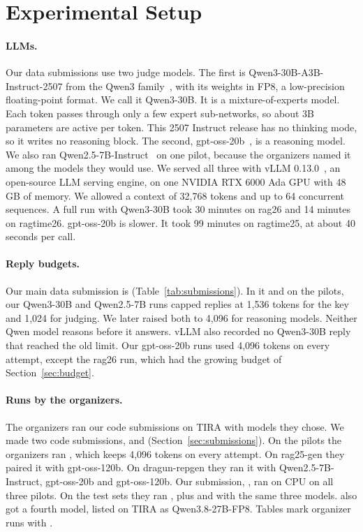 \section{Experimental Setup}
\label{sec:setup}

\paragraph{LLMs.} Our data submissions use two judge models. The first is
Qwen3-30B-A3B-Instruct-2507 from the Qwen3 family~\cite{yang2025qwen3}, with its
weights in FP8, a low-precision floating-point format. We call it Qwen3-30B. It is a mixture-of-experts
model. Each token passes through only a few expert sub-networks, so about 3B
parameters are active per token. This 2507 Instruct release has no thinking mode,
so it writes no reasoning block. The second, gpt-oss-20b~\cite{openai2025gptoss},
is a reasoning model. We also ran Qwen2.5-7B-Instruct~\cite{qwen2025qwen25} on one
pilot, because the organizers named it among the models they would use. We served
all three with vLLM 0.13.0~\cite{kwon2023vllm}, an open-source LLM serving engine,
on one NVIDIA RTX 6000 Ada GPU with 48\,GB of memory. We allowed a context of
32,768 tokens and up to 64 concurrent sequences. A full run with Qwen3-30B
took 30 minutes on rag26 and 14 minutes on ragtime26. gpt-oss-20b is slower. It
took 99 minutes on ragtime25, at about 40 seconds per call.

\paragraph{Reply budgets.} Our main data submission is  (Table~\ref{tab:submissions}). In it and on the pilots, our Qwen3-30B and Qwen2.5-7B runs capped replies at
1,536 tokens for the key and 1,024 for judging. We later raised both to 4,096 for
reasoning models. Neither Qwen model reasons before it answers. vLLM also recorded
no Qwen3-30B reply that reached the old limit. Our gpt-oss-20b runs used 4,096
tokens on every attempt, except the rag26 run, which had the growing budget of
Section~\ref{sec:budget}.

\paragraph{Runs by the organizers.} The organizers ran our code submissions on
TIRA with models they chose. We made two  code submissions,  and  (Section~\ref{sec:submissions}). On the pilots the organizers ran , which keeps
4,096 tokens on every attempt. On rag25-gen they paired it with gpt-oss-120b. On
dragun-repgen they ran it with Qwen2.5-7B-Instruct, gpt-oss-20b and gpt-oss-120b.
Our  submission, , ran on CPU on all three
pilots. On the test sets they ran , plus  and
 with the same three models.  also got a fourth
model, listed on TIRA as Qwen3.8-27B-FP8. Tables mark organizer runs with \org.

